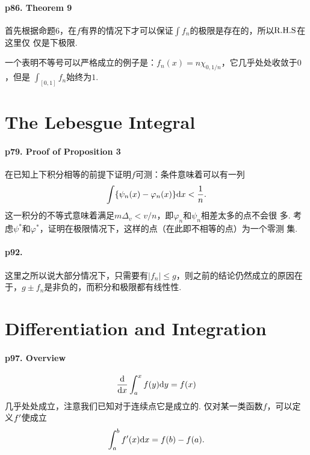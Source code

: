   \paragraph{p86. Theorem 9}
    首先根据命题6，在$f$有界的情况下才可以保证$\int f_n$的极限是存在的，所以$\text{R.H.S}$在这里仅
    仅是下极限. \par
    一个表明不等号可以严格成立的例子是：$f_n(x)=n\chi_{0,1/n}$，它几乎处处收敛于$0$，但是
    $\int_[0,1] f_n$始终为$1$. 


\newpage
\section{The Lebesgue Integral}
  \paragraph{p79. Proof of Proposition 3}
    在已知上下积分相等的前提下证明$f$可测：条件意味着可以有一列
    \[
      \int \{\psi_n(x)-\varphi_n(x)\}\mathrm{d} x < \frac{1}{n}.
    \]
    这一积分的不等式意味着满足$m\Delta_v<v/n$，即$\varphi_n$和$\psi_n$相差太多的点不会很
    多. 考虑$\psi^*$和$\varphi^*$，证明在极限情况下，这样的点（在此即不相等的点）为一个零测
    集. 

  \paragraph{p92.}
    这里之所以说大部分情况下，只需要有$|f_n|\le g$，则之前的结论仍然成立的原因在于，$g\pm 
    f_n$是非负的，而积分和极限都有线性性. 

\newpage
\section{Differentiation and Integration}
  \paragraph{p97. Overview}
    \begin{equation}
      \label{eq:ch5-overview-1}
      \frac{\mathrm{d}}{\mathrm{d} x}\int_a^x f(y)\mathrm{d} y = f(x)
    \end{equation}
    几乎处处成立，注意我们已知对于连续点它是成立的. 仅对某一类函数$f$，可以定义$f^\prime$使成立
    \begin{equation}
      \label{eq:ch5-overview-2}
      \int_a^b f^\prime(x)\mathrm{d} x = f(b)-f(a).
    \end{equation}

